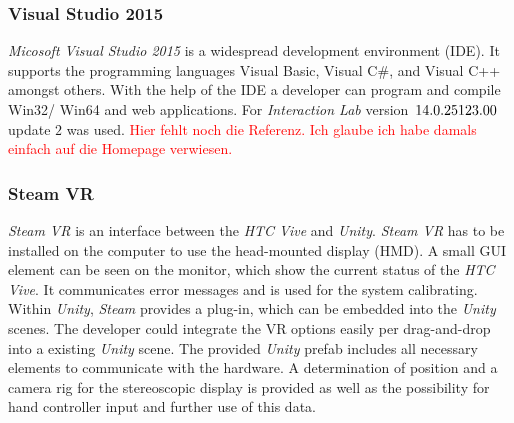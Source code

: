 	\subsubsection{Visual Studio 2015}\label{sec:VisualStudio}
	\textit{Micosoft Visual Studio 2015} is a widespread development environment (IDE). It supports the programming languages Visual Basic, Visual C$\#$, and Visual C++ amongst others. With the help of the IDE a developer can program and compile Win32/ Win64 and web applications. For \textit{Interaction Lab} version~$14.0.\-25123.00$ update $2$ was used. \textcolor{red}{Hier fehlt noch die Referenz. Ich glaube ich habe damals einfach auf die Homepage verwiesen.}
	
	\subsubsection{Steam VR}
	\textit{Steam VR} \cite{website:steamVR} is an interface between the \textit{HTC Vive} and \textit{Unity}. \textit{Steam VR} has to be installed on the computer to use the head-mounted display (HMD). A small GUI element can be seen on the monitor, which show the current status of the \textit{HTC Vive}. It communicates error messages and is used for the system calibrating. \\
	Within \textit{Unity}, \textit{Steam} provides a plug-in, which can be embedded into the \textit{Unity} scenes. The developer could integrate the VR options easily per drag-and-drop into a existing \textit{Unity} scene. 
	The provided \textit{Unity} prefab includes all necessary elements to communicate with the hardware. A determination of position and a camera rig for the stereoscopic display is provided as well as the possibility for hand controller input and further use of this data.
	

